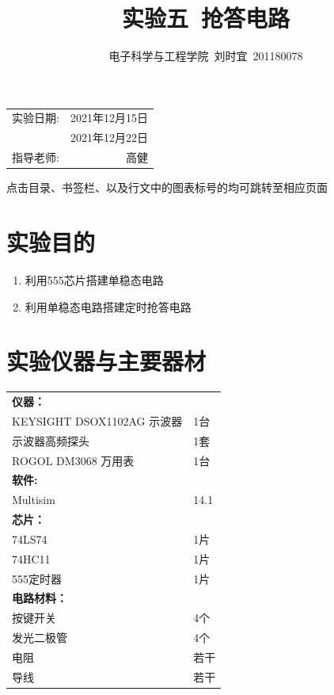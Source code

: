 \documentclass[UTF8]{ctexart}
\title{\textbf{实验五\ 抢答电路}} %
\author{电子科学与工程学院\ 刘时宜\ 201180078} %
\date{} %
\numberwithin{figure}{subsection}
\numberwithin{table}{subsection}
\numberwithin{equation}{subsection}
\begin{document}
\pagestyle{EE_Digital1Exp_template}

\maketitle %

\begin{center}
    \begin{tabular}{l r}
    实验日期: & 2021年12月15日 \\ %
             & 2021年12月22日 \\ %
    指导老师: & 高健 %
    \end{tabular}
    \par 点击目录、书签栏、以及行文中的图表标号的均可跳转至相应页面
    \end{center}
    

\tableofcontents

\section{实验目的}
\begin{enumerate}
    \item 利用555芯片搭建单稳态电路
    \item 利用单稳态电路搭建定时抢答电路
\end{enumerate}

\section{实验仪器与主要器材}
\begin{center}
    \begin{tabular}{ll}
        \textbf{仪器：} & \\
        KEYSIGHT DSOX1102AG 示波器 & 1台\\
        示波器高频探头 & 1套\\
        ROGOL DM3068 万用表 & 1台\\
        \textbf{软件:} & \\
        Multisim & 14.1 \\
        \textbf{芯片：} & \\
        74LS74 & 1片 \\
        74HC11 & 1片 \\
        555定时器 & 1片 \\
        \textbf{电路材料：} & \\
        按键开关 & 4个 \\
        发光二极管 & 4个 \\
        电阻 & 若干 \\
        导线 & 若干 \\
    \end{tabular}
\end{center}
\end{document}

